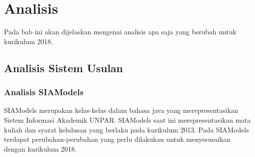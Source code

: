 \chapter{Analisis}
\label{chap:analisis}

Pada bab ini akan dijelaskan mengenai analisis apa saja yang berubah untuk kurikulum 2018.

\section{Analisis Sistem Usulan}

\subsection{Analisis SIAModels }

SIAModels merupakan kelas-kelas dalam bahasa java yang merepresentasikan Sistem Informasi Akademik UNPAR. SIAModels saat ini merepresentasikan mata kuliah dan syarat kelulusan yang berlaku pada kurikulum 2013. Pada SIAModels terdapat perubahan-perubahan yang perlu dilakukan untuk menyesusaikan dengan kurikulum 2018.

